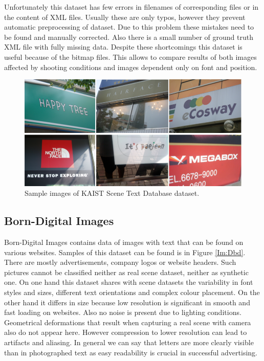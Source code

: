 Unfortunately this dataset has few errors in filenames of corresponding files or in the content of XML files. Usually these are only typos, however they prevent automatic preprocessing of dataset. Due to this problem these mistakes need to be found and  manually corrected. Also there is a small number of ground truth XML file with fully missing data. 
Despite these shortcomings this dataset is useful because of the bitmap files. This allows to compare results of both images affected by shooting conditions and images dependent only on font and position.

\begin{figure}[hbtp]
    \centering
    \includegraphics[width=\textwidth]{obrazky/Dataset_kaist.png}
    \caption{Sample images of KAIST Scene Text Database dataset.}
    \label{Im:Dkaist}
\end{figure}

\subsection*{Born-Digital Images}

Born-Digital Images contains data of images with text that can be found on various websites. Samples of this dataset can be found is in Figure \ref*{Im:Dbd}. There are mostly advertisements, company logos or website headers. Such pictures cannot be classified neither as real scene dataset, neither as synthetic one. On one hand  this dataset shares with scene datasets the variability in font styles and sizes, different text orientations and complex colour placement. On the other hand it differs in size because low resolution is significant in smooth and fast loading on websites. Also no noise is present due to lighting conditions. Geometrical deformations that result when capturing a real scene with camera also do not appear here. However compression to lower resolution can lead to artifacts and aliasing. In general we can say that letters are more clearly visible than in photographed text as easy readability is crucial in successful advertising.\cite{born-digital1}

